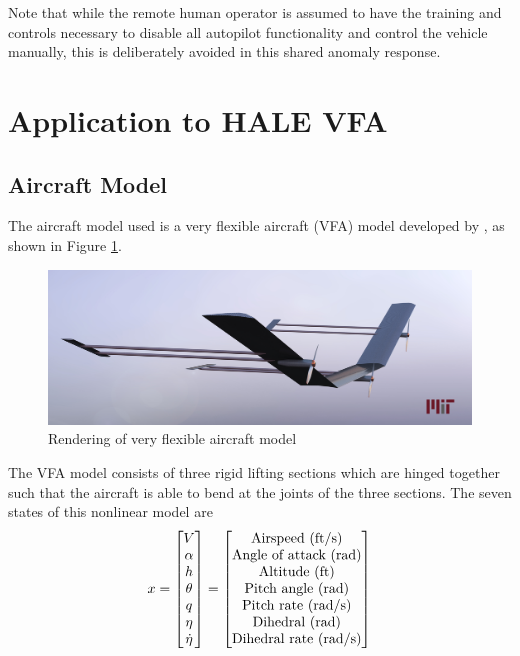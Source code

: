 \documentclass[english]{ifacconf}
\begin{document}
Note that while the remote human operator is assumed to have the training and controls necessary to disable all autopilot functionality and control the vehicle manually, this is deliberately avoided in this shared anomaly response. 

\section{Application to HALE VFA}
\subsection{Aircraft Model}
The aircraft model used is a very flexible aircraft (VFA) model developed by \cite{gibson2011modeling}, as shown in Figure \ref{fig:vfa}. 
\begin{figure}[htbp]
	\centering
	\includegraphics[width=0.95\columnwidth]{../fig/VFA_16.jpg}
	\caption{Rendering of very flexible aircraft model}
	\label{fig:vfa}
\end{figure}

The VFA model consists of three rigid lifting sections which are hinged together such that the aircraft is able to bend at the joints of the three sections. The seven states of this nonlinear model are
\begin{equation}
x = \begin{bmatrix}
V \\
\alpha \\
h \\
\theta \\
q\\
\eta\\
\dot{\eta}
\end{bmatrix} =
\begin{bmatrix}
	 $Airspeed (ft/s)$\\ $Angle of attack (rad)$\\ $Altitude (ft)$\\ $Pitch angle (rad)$\\ $Pitch rate (rad/s)$\\ $Dihedral (rad)$\\ $Dihedral rate (rad/s)$
\end{bmatrix}
\end{equation}
\end{document}
